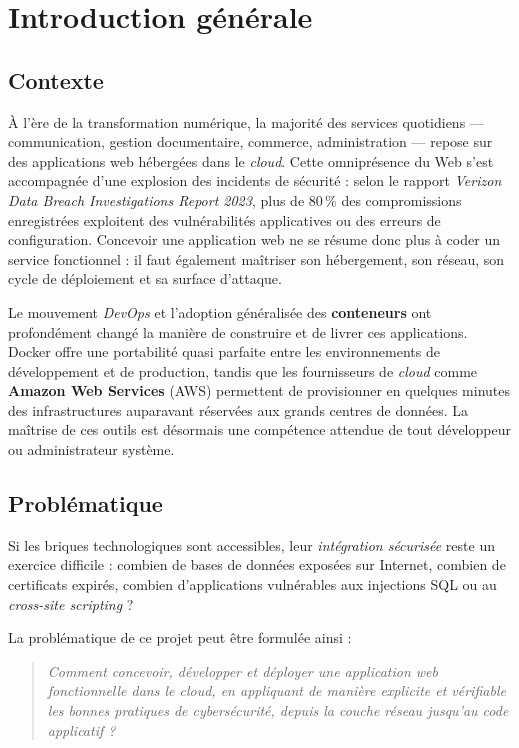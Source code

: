 \chapter*{Introduction générale}

\section*{Contexte}

À l'ère de la transformation numérique, la majorité des services
quotidiens — communication, gestion documentaire, commerce,
administration — repose sur des applications web hébergées dans le
\emph{cloud}. Cette omniprésence du Web s'est accompagnée d'une
explosion des incidents de sécurité : selon le rapport
\textit{Verizon Data Breach Investigations Report 2023}, plus de 80\,\%
des compromissions enregistrées exploitent des vulnérabilités
applicatives ou des erreurs de configuration. Concevoir une application
web ne se résume donc plus à coder un service fonctionnel : il faut
également maîtriser son hébergement, son réseau, son cycle de
déploiement et sa surface d'attaque.

Le mouvement \emph{DevOps} et l'adoption généralisée des \textbf{conteneurs}
ont profondément changé la manière de construire et de livrer ces
applications. Docker offre une portabilité quasi parfaite entre les
environnements de développement et de production, tandis que les
fournisseurs de \emph{cloud} comme \textbf{Amazon Web Services} (AWS)
permettent de provisionner en quelques minutes des infrastructures
auparavant réservées aux grands centres de données. La maîtrise de
ces outils est désormais une compétence attendue de tout développeur
ou administrateur système.

\section*{Problématique}

Si les briques technologiques sont accessibles, leur \emph{intégration
sécurisée} reste un exercice difficile : combien de bases de données
exposées sur Internet, combien de certificats expirés, combien
d'applications vulnérables aux injections SQL ou au \emph{cross-site
scripting} ?

La problématique de ce projet peut être formulée ainsi :

\begin{quote}
\itshape Comment concevoir, développer et déployer une application
web fonctionnelle dans le \emph{cloud}, en appliquant de manière
explicite et vérifiable les bonnes pratiques de cybersécurité, depuis
la couche réseau jusqu'au code applicatif ?
\end{quote}

